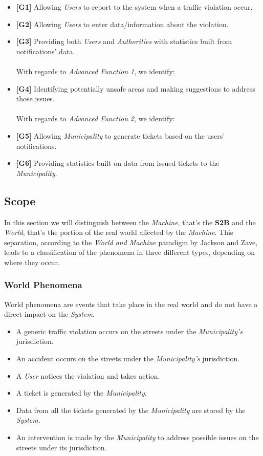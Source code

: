\documentclass {article}
\begin{document}
		\begin{itemize}
   			 \item {\bf [G1]} Allowing {\it Users} to report to the system when a traffic violation occur.		
			 \item {\bf [G2]} Allowing {\it Users} to enter data/information about the violation.
   			 \item {\bf [G3]} Providing both {\it Users} and {\it Authorities} with statistics built from notifications’ data.    			  
   			 \\
			 \\
With regards to {\it {\it Advanced Function 1}}, we identify: 
   			 \item {\bf [G4]} Identifying potentially unsafe areas and making suggestions to address those issues.
   			 \\
			 \\
 With regards to {\it Advanced Function 2}, we identify:
			  \item {\bf [G5]} Allowing {\it Municipality} to generate tickets based on the users’ notifications. 
			  \item {\bf [G6]} Providing statistics built on data from issued tickets to the {\it Municipality}.		
			  \end{itemize}
			
	\subsection{Scope}
	In this section we will distinguish between the {\it Machine}, that's the {\bf S2B} and the {\it World}, that's the portion of the real world affected by the {\it Machine}. This separation, according to the {\it World and Machine} paradigm by Jackson and Zave, leads to a classification of the phenomena in three different types, depending on where they occur. 		
		\subsubsection{World Phenomena}
		World phenomena are events that take place in the real world and do not have a direct impact on the {\it System}. 
		\begin{itemize}
			\item A generic traffic violation occurs on the streets under the {\it Municipality's} jurisdiction. 
			\item An accident occurs on the streets under the {\it Municipality's} jurisdiction.
			\item A {\it User} notices the violation and takes action.
			\item A ticket is generated by the {\it Municipality}.
			\item Data from all the tickets generated by the {\it Municipality} are stored by the {\it System}.
			\item An intervention is made by the {\it Municipality} to address possible issues on the streets under its jurisdiction.
		\end{itemize}
\end{document}
